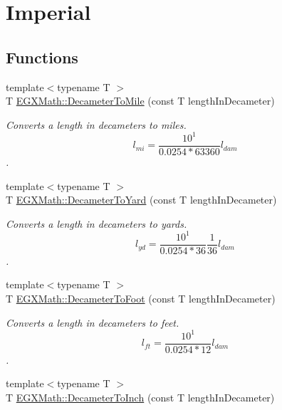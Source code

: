 \hypertarget{group___e_g_x_math-_conversions-_length_conversions-_s_i-_decameter-_imperial}{}\section{Imperial}
\label{group___e_g_x_math-_conversions-_length_conversions-_s_i-_decameter-_imperial}
\subsection*{Functions}
\begin{DoxyCompactItemize}
\item 
{\footnotesize template$<$typename T $>$ }\\T \mbox{\hyperlink{group___e_g_x_math-_conversions-_length_conversions-_s_i-_decameter-_imperial_gac2a54223d869e01fc7a9c73fbf3f2906}{E\+G\+X\+Math\+::\+Decameter\+To\+Mile}} (const T length\+In\+Decameter)
\begin{DoxyCompactList}\small\item\em Converts a length in decameters to miles. \[ l_{mi}=\frac{10^{1}}{0.0254 * 63360} l_{dam} \]. \end{DoxyCompactList}\item 
{\footnotesize template$<$typename T $>$ }\\T \mbox{\hyperlink{group___e_g_x_math-_conversions-_length_conversions-_s_i-_decameter-_imperial_ga42a81b14a91ba9ddb4967faa55b6a3a0}{E\+G\+X\+Math\+::\+Decameter\+To\+Yard}} (const T length\+In\+Decameter)
\begin{DoxyCompactList}\small\item\em Converts a length in decameters to yards. \[ l_{yd}= \frac{10^{1}}{0.0254 * 36} \frac{1}{36} l_{dam} \]. \end{DoxyCompactList}\item 
{\footnotesize template$<$typename T $>$ }\\T \mbox{\hyperlink{group___e_g_x_math-_conversions-_length_conversions-_s_i-_decameter-_imperial_gad2829e03e1755db4f7f9b21070ecaef6}{E\+G\+X\+Math\+::\+Decameter\+To\+Foot}} (const T length\+In\+Decameter)
\begin{DoxyCompactList}\small\item\em Converts a length in decameters to feet. \[ l_{ft}= \frac{10^{1}}{0.0254 * 12} l_{dam} \]. \end{DoxyCompactList}\item 
{\footnotesize template$<$typename T $>$ }\\T \mbox{\hyperlink{group___e_g_x_math-_conversions-_length_conversions-_s_i-_decameter-_imperial_ga246ab50e821640008d965b5690226df5}{E\+G\+X\+Math\+::\+Decameter\+To\+Inch}} (const T length\+In\+Decameter)

\end{DoxyCompactItemize}
